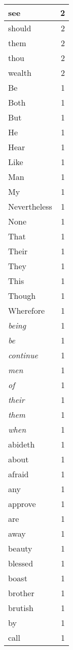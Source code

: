 \begin{center}
\begin{longtable}{l|r}
see & 2 \\ \hline
should & 2 \\ \hline
them & 2 \\ \hline
thou & 2 \\ \hline
wealth & 2 \\ \hline
Be & 1 \\ \hline
Both & 1 \\ \hline
But & 1 \\ \hline
He & 1 \\ \hline
Hear & 1 \\ \hline
Like & 1 \\ \hline
Man & 1 \\ \hline
My & 1 \\ \hline
Nevertheless & 1 \\ \hline
None & 1 \\ \hline
That & 1 \\ \hline
Their & 1 \\ \hline
They & 1 \\ \hline
This & 1 \\ \hline
Though & 1 \\ \hline
Wherefore & 1 \\ \hline
\emph{being} & 1 \\ \hline
\emph{be} & 1 \\ \hline
\emph{continue} & 1 \\ \hline
\emph{men} & 1 \\ \hline
\emph{of} & 1 \\ \hline
\emph{their} & 1 \\ \hline
\emph{them} & 1 \\ \hline
\emph{when} & 1 \\ \hline
abideth & 1 \\ \hline
about & 1 \\ \hline
afraid & 1 \\ \hline
any & 1 \\ \hline
approve & 1 \\ \hline
are & 1 \\ \hline
away & 1 \\ \hline
beauty & 1 \\ \hline
blessed & 1 \\ \hline
boast & 1 \\ \hline
brother & 1 \\ \hline
brutish & 1 \\ \hline
by & 1 \\ \hline
call & 1 \\ \hline

\end{longtable}
\end{center}
